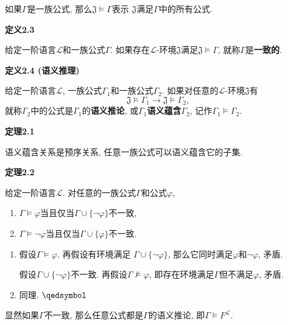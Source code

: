 \documentclass[UTF8]{ctexart}
\begin{document}
\vspace{10pt}

如果$\Gamma$是一族公式, 那么$\mathfrak{J}\models\Gamma$表示
$\mathfrak{J}$满足$\Gamma$中的所有公式.

\vspace{10pt}

\hypertarget{sec:定义2.3}{}
\noindent\textbf{定义2.3}

给定一阶语言$\mathcal{L}$和一族公式$\Gamma$.
如果存在$\mathcal{L}$-环境$\mathfrak{J}$满足$\mathfrak{J}\models\Gamma$,
就称$\Gamma$是\textbf{一致的}.

\vspace{10pt}

\hypertarget{sec:定义2.4}{}
\noindent\textbf{定义2.4 (语义推理)}

给定一阶语言$\mathcal{L}$, 一族公式$\Gamma_1$和一族公式$\Gamma_2$.
如果对任意的$\mathcal{L}$-环境$\mathfrak{J}$有
\[
    \mathfrak{J}\models\Gamma_1\to\mathfrak{J}\models\Gamma_2,
\]
就称$\Gamma_2$中的公式是$\Gamma_1$的\textbf{语义推论},
或$\Gamma_1$\textbf{语义蕴含}$\Gamma_2$, 记作$\Gamma_1\models\Gamma_2$.

\vspace{10pt}

\hypertarget{sec:定理2.1}{}
\noindent\textbf{定理2.1}

语义蕴含关系是预序关系, 任意一族公式可以语义蕴含它的子集.

\vspace{10pt}

\hypertarget{sec:定理2.2}{}
\noindent\textbf{定理2.2}

给定一阶语言$\mathcal{L}$. 对任意的一族公式$\Gamma$和公式$\varphi$,
\begin{enumerate}
    \item $\Gamma\models\varphi$当且仅当$\Gamma\cup\{\neg\varphi\}$不一致,
    \item $\Gamma\models\neg\varphi$当且仅当$\Gamma\cup\{\varphi\}$不一致.
\end{enumerate}


\begin{enumerate}
    \item 假设$\Gamma\models\varphi$. 再假设有环境满足
    $\Gamma\cup\{\neg\varphi\}$, 那么它同时满足$\varphi$和$\neg\varphi$, 矛盾.

    \hspace{2.17em}
    假设$\Gamma\cup\{\neg\varphi\}$不一致. 再假设$\Gamma\not\models\varphi$,
    即存在环境满足$\Gamma$但不满足$\varphi$, 矛盾.

    \item 同理. \hfill $\qedsymbol$
\end{enumerate}

\vspace{10pt}

显然如果$\Gamma$不一致, 那么任意公式都是$\Gamma$的语义推论,
即$\Gamma\models F^{\mathcal{L}}$.
\end{document}
